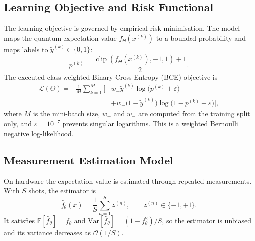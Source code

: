 \documentclass[conference]{IEEEtran}
\begin{document}
\subsection{Learning Objective and Risk Functional}
The learning objective is governed by empirical risk minimisation. The model maps the quantum expectation value $f_\Theta(x^{(k)})$ to a bounded probability and maps labels to $\tilde{y}^{(k)} \in \{0,1\}$:
\begin{equation}
p^{(k)} = \frac{\operatorname{clip}\!\left(f_\Theta(x^{(k)}),-1,1\right) + 1}{2}.
\end{equation}
The executed class-weighted Binary Cross-Entropy (BCE) objective is
\begin{equation}
\begin{aligned}
\mathcal{L}(\Theta) = -\frac{1}{M} \sum_{k=1}^{M} \Big[&w_{+}\tilde{y}^{(k)} \log\!\big(p^{(k)}+\varepsilon\big) \\
&+ w_{-}\big(1 - \tilde{y}^{(k)}\big) \log\!\big(1 - p^{(k)}+\varepsilon\big)\Big],
\end{aligned}
\end{equation}
where $M$ is the mini-batch size, $w_{+}$ and $w_{-}$ are computed from the training split only, and $\varepsilon=10^{-7}$ prevents singular logarithms. This is a weighted Bernoulli negative log-likelihood.

\subsection{Measurement Estimation Model}
On hardware the expectation value is estimated through repeated measurements. With $S$ shots, the estimator is
\begin{equation}
\hat{f}_\theta(x) = \frac{1}{S} \sum_{n=1}^{S} z^{(n)}, \qquad z^{(n)} \in \{-1, +1\}.
\end{equation}
It satisfies $\mathbb{E}[\hat{f}_\theta] = f_\theta$ and $\text{Var}[\hat{f}_\theta] = (1 - f_\theta^2)/S$, so the estimator is unbiased and its variance decreases as $\mathcal{O}(1/S)$.
\end{document}
